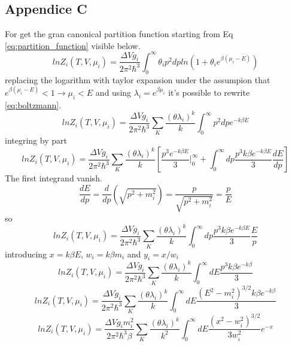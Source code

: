 \documentclass[12pt,a4paper]{book}
\begin{document}
	\subsection{Appendice C}
	For get the gran canonical partition function starting from Eq \ref{eq:partition_function} visible below.
	\begin{equation}
		ln Z_i(T,V,\mu_i)= \frac{\Delta V g_i}{2\pi^2\hbar^3} \int_{0}^{\infty} \theta_i p^2 dp ln(1+\theta_i e^{\beta(\mu_i-E)})
	\end{equation}
	replacing the logarithm with taylor expansion under the assumpion that $e^{\beta(\mu_i-E)} < 1 \rightarrow \mu_i < E$ and using $\lambda_i= e^{\beta \mu_i}$ it's possible to rewrite \ref{eq:boltzmann}.
	\begin{equation}
		ln Z_i(T,V,\mu_i)= \frac{\Delta V g_i}{2\pi^2\hbar^3} \sum_{K} \frac{(\theta \lambda_i)^k}{k} \int_{0}^{\infty} p^2 dp e^{-k \beta E}
	\end{equation}
	integring by part
	\begin{equation}
		ln Z_i(T,V,\mu_i)= \frac{\Delta V g_i}{2\pi^2\hbar^3} \sum_{K} \frac{(\theta \lambda_i)^k}{k} \left[\frac{p^3 e^{-k \beta E}}{3} \big|_0^\infty + \int_{0}^{\infty} dp \frac{p^3 k \beta e^{-k \beta E}}{3} \frac{dE}{dp} \right]
	\end{equation}
	The first integrand vanish.
	\begin{equation}
		\frac{dE}{dp} = \frac{d}{dp} (\sqrt{p^2+m_i^2}) = \frac{p}{\sqrt{p^2+m_i^2}} = \frac{p}{E}
	\end{equation}
	so
	\begin{equation}
		ln Z_i(T,V,\mu_i)= \frac{\Delta V g_i}{2\pi^2\hbar^3} \sum_{K} \frac{(\theta \lambda_i)^k}{k}  \int_{0}^{\infty} dp \frac{p^3 k \beta e^{-k \beta E}}{3} \frac{E}{p} 
	\end{equation}
	introducing $x= k\beta E$, $w_i=k\beta m_i$ and $y_i=x/w_i$
	\begin{equation}
		ln Z_i(T,V,\mu_i)= \frac{\Delta V g_i}{2\pi^2\hbar^3} \sum_{K} \frac{(\theta \lambda_i)^k}{k}  \int_{0}^{\infty} dE \frac{p^3 k \beta e^{-k \beta}}{3} 
	\end{equation}
	\begin{equation}
		ln Z_i(T,V,\mu_i)= \frac{\Delta V g_i}{2\pi^2\hbar^3} \sum_{K} \frac{(\theta \lambda_i)^k}{k}  \int_{0}^{\infty} dE \frac{(E^2-m_i^2)^{3/2} k \beta e^{-k \beta}}{3} 
	\end{equation}
	\begin{equation}
		ln Z_i(T,V,\mu_i)= \frac{\Delta V g_i m_i^2}{2\pi^2\hbar^3 \beta} \sum_{K} \frac{(\theta \lambda_i)^k}{k^2}  \int_{0}^{\infty} dE \frac{(x^2-w_i^2)^{3/2}}{3 w_i^2} e^{-x} 
	\end{equation}
	
\end{document}
